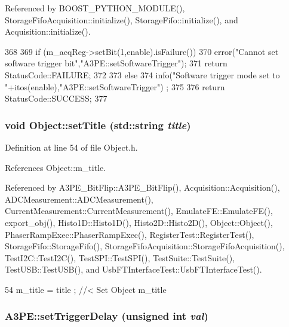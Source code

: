 Referenced by BOOST\_\-PYTHON\_\-MODULE(), StorageFifoAcquisition::initialize(), StorageFifo::initialize(), and Acquisition::initialize().


\begin{DoxyCode}
368                                               {
369   if (m_acqReg->setBit(1,enable).isFailure()){
370     error("Cannot set software trigger bit","A3PE::setSoftwareTrigger");
371     return StatusCode::FAILURE;
372   }
373   else{
374     info("Software trigger mode set to "+itos(enable),"A3PE::setSoftwareTrigger")
      ;
375   }
376   return StatusCode::SUCCESS;
377 }
\end{DoxyCode}
\hypertarget{classObject_a89557dbbad5bcaa02652f5d7fa35d20f}{
\subsubsection[{setTitle}]{\setlength{\rightskip}{0pt plus 5cm}void Object::setTitle (std::string {\em title})}}
\label{classObject_a89557dbbad5bcaa02652f5d7fa35d20f}


Definition at line 54 of file Object.h.

References Object::m\_\-title.

Referenced by A3PE\_\-BitFlip::A3PE\_\-BitFlip(), Acquisition::Acquisition(), ADCMeasurement::ADCMeasurement(), CurrentMeasurement::CurrentMeasurement(), EmulateFE::EmulateFE(), export\_\-obj(), Histo1D::Histo1D(), Histo2D::Histo2D(), Object::Object(), PhaserRampExec::PhaserRampExec(), RegisterTest::RegisterTest(), StorageFifo::StorageFifo(), StorageFifoAcquisition::StorageFifoAcquisition(), TestI2C::TestI2C(), TestSPI::TestSPI(), TestSuite::TestSuite(), TestUSB::TestUSB(), and UsbFTInterfaceTest::UsbFTInterfaceTest().


\begin{DoxyCode}
54 { m_title = title ; } //< Set Object m_title
\end{DoxyCode}
\hypertarget{classA3PE_a6a63fc9503e0aa89ee9928fc7222ce0f}{
\subsubsection[{setTriggerDelay}]{ A3PE::setTriggerDelay (unsigned int {\em val})}}
\label{classA3PE_a6a63fc9503e0aa89ee9928fc7222ce0f}


